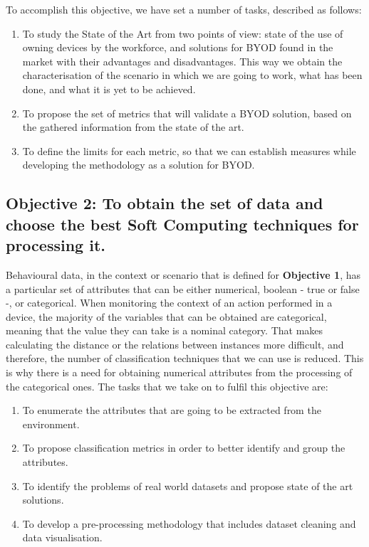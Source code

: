 To accomplish this objective, we have set a number of tasks, described as follows:

\begin{enumerate}
	\item To study the State of the Art from two points of view: state of the use of owning devices by the workforce, and solutions for BYOD found in the market with their advantages and disadvantages. This way we obtain the characterisation of the scenario in which we are going to work, what has been done, and what it is yet to be achieved.
	\item To propose the set of metrics that will validate a BYOD solution, based on the gathered information from the state of the art.
	\item To define the limits for each metric, so that we can establish measures while developing the methodology as a solution for BYOD.
\end{enumerate}


\newcommand{\objectivedata}{To obtain the set of data and choose the best Soft Computing techniques for processing it.}

\subsection*{Objective 2: \objectivedata} 
\label{subsec:intro:obj:methodology}

Behavioural data, in the context or scenario that is defined for \textbf{Objective 1}, has a particular set of attributes that can be either numerical, boolean - true or false -, or categorical. When monitoring the context of an action performed in a device, the majority of the variables that can be obtained are categorical, meaning that the value they can take is a nominal category. That makes calculating the distance or the relations between instances more difficult, and therefore, the number of classification techniques that we can use is reduced. This is why there is a need for obtaining numerical attributes from the processing of the categorical ones. The tasks that we take on to fulfil this objective are:

\begin{enumerate}
	\item To enumerate the attributes that are going to be extracted from the environment.
	\item To propose classification metrics in order to better identify and group the attributes.
	\item To identify the problems of real world datasets and propose state of the art solutions.
	\item To develop a pre-processing methodology that includes dataset cleaning and data visualisation.
\end{enumerate}

